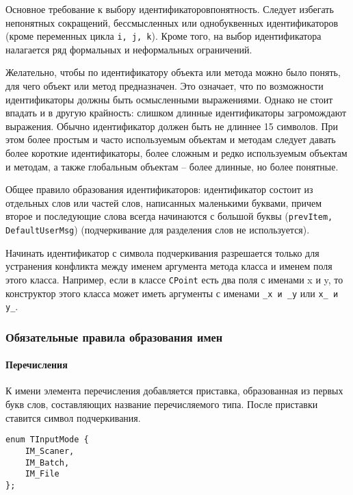 Основное требование к выбору идентификаторов\mdash понятность. Следует избегать непонятных сокращений, бессмысленных или однобуквенных идентификаторов (кроме переменных цикла \lstinline|i, j, k|). Кроме того, на выбор идентификатора налагается ряд формальных и неформальных ограничений.

Желательно, чтобы по идентификатору объекта или метода можно было понять, для чего объект или метод предназначен. Это означает, что по возможности идентификаторы должны быть осмысленными выражениями. Однако не стоит впадать и в другую крайность: слишком длинные идентификаторы загромождают выражения. Обычно идентификатор должен быть не длиннее 15 символов. При этом более простым и часто используемым объектам и методам следует давать более короткие идентификаторы, более сложным и редко используемым объектам и методам, а также глобальным объектам – более длинные, но более понятные.

Общее правило образования идентификаторов: идентификатор состоит из отдельных слов или частей слов, написанных маленькими буквами, причем второе и последующие слова всегда начинаются с большой буквы (\lstinline|prevItem, DefaultUserMsg|) (подчеркивание для разделения слов не используется).

Начинать идентификатор с символа подчеркивания разрешается только для устранения конфликта между именем аргумента метода класса и именем поля этого класса. Например, если в классе \lstinline|CPoint| есть два поля с именами x и y, то конструктор этого класса может иметь аргументы с именами \lstinline|_x и _y| или \lstinline|x_ и y_|.

\newpage
\subsubsection{Обязательные правила образования имен}

\paragraph{Перечисления} %

К имени элемента перечисления добавляется приставка, образованная из первых букв слов, составляющих название перечисляемого типа. После приставки ставится символ подчеркивания.

\begin{lstlisting}[caption=\raggedright{Образование имени перечисления}, frame=single]
enum TInputMode {
    IM_Scaner,
    IM_Batch,
    IM_File
};
\end{lstlisting}

